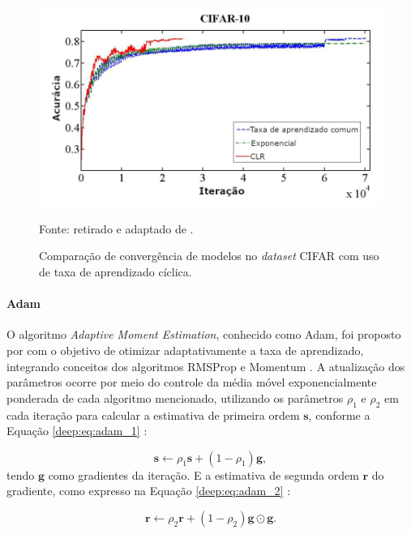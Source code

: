 \begin{figure}[H]
    \centering
    \caption[Comparação de convergência de modelos no CIFAR.]{Comparação de convergência de modelos no \textit{dataset} CIFAR \citep{Krizhevsky2014TheDataset} com uso de taxa de aprendizado cíclica.}
    \includegraphics[width=0.8\linewidth]{recursos/imagens/deep/cifar_lr.png}
    \label{deep:optimization:cyclical_lr}

    Fonte: retirado e adaptado de \cite{Smith2017CyclicalNetworks}.
\end{figure}


\paragraph{Adam}
\label{deep:optimization:adam}

O algoritmo \textit{Adaptive Moment Estimation}, conhecido como Adam, foi proposto por \cite{Kingma2014Adam:Optimization} com o objetivo de otimizar adaptativamente a taxa de aprendizado, integrando conceitos dos algoritmos RMSProp \citep{Hinton2012NeuralDescent} e Momentum \citep{Polyak1964SomeMethods}. A atualização dos parâmetros ocorre por meio do controle da média móvel exponencialmente ponderada de cada algoritmo mencionado, utilizando os parâmetros $\rho_{1}$ e $\rho_{2}$ em cada iteração para calcular a estimativa de primeira ordem $\boldsymbol{s}$, conforme a Equação \ref{deep:eq:adam_1} \citep{Goodfellow2016}:

\begin{equation}
    \label{deep:eq:adam_1}
    \boldsymbol{s} \leftarrow \rho_{1} \boldsymbol{s} + (1 - \rho_{1})\boldsymbol{g},
\end{equation}
tendo $\boldsymbol{g}$ como gradientes da iteração. E a estimativa de segunda ordem $\boldsymbol{r}$ do gradiente, como expresso na Equação \ref{deep:eq:adam_2} \citep{Goodfellow2016}:

\begin{equation}
    \label{deep:eq:adam_2}
    \boldsymbol{r} \leftarrow \rho_{2} \boldsymbol{r} + (1 - \rho_{2})\boldsymbol{g} \odot \boldsymbol{g}.
\end{equation}

